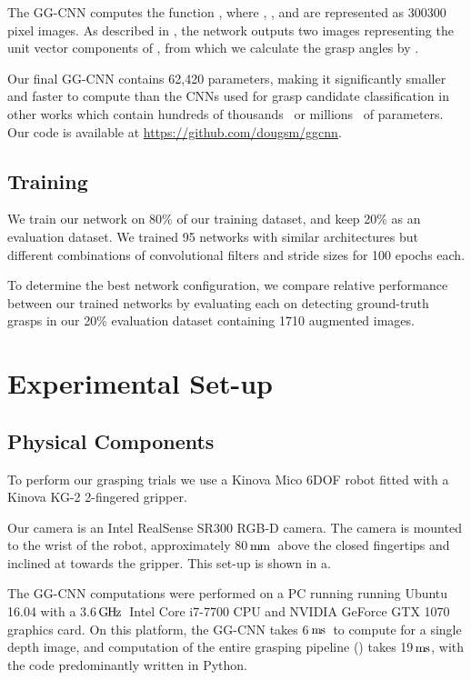\documentclass[conference]{IEEEtran}
\newcommand{\pack}	{\hspace{-0.08em}}
\newcommand{\GHz}	{\ensuremath{\rm\,G\pack H\pack z}}
\newcommand{\mm}	{\ensuremath{\rm\,m\pack m}}
\newcommand{\ms}	{\ensuremath{\rm\,m\pack s}}
\begin{document}
The GG-CNN computes the function , where , ,  and  are represented as 300300 pixel images.  As described in , the network outputs two images representing the unit vector components of , from which we calculate the grasp angles by .

Our final GG-CNN contains 62,420 parameters, making it significantly smaller and faster to compute than the CNNs used for grasp candidate classification in other works which contain hundreds of thousands~\cite{he2016deep, Levine2017LearningCollection} or millions~\cite{Johns2016DeepUncertainty, Mahler2017Dex2, Pinto2016SupersizingHours, Redmon2015Real-timeNetworks} of parameters.  Our code is available at \href{https://github.com/dougsm/ggcnn}{https://github.com/dougsm/ggcnn}.

\subsection{Training}

We train our network on 80\% of our training dataset, and keep 20\% as an evaluation dataset.  We trained 95 networks with similar architectures but different combinations of convolutional filters and stride sizes for 100 epochs each.  


To determine the best network configuration, we compare relative performance between our trained networks by evaluating each on detecting ground-truth grasps in our 20\% evaluation dataset containing 1710 augmented images.  

\section{Experimental Set-up}

\subsection{Physical Components}

To perform our grasping trials we use a Kinova Mico 6DOF robot fitted with a Kinova KG-2 2-fingered gripper.

Our camera is an Intel RealSense SR300 RGB-D camera.  The camera is mounted to the wrist of the robot, approximately 80\mm~above the closed fingertips and inclined at  towards the gripper.  This set-up is shown in a.

The GG-CNN computations were performed on a PC running running Ubuntu 16.04 with a 3.6\GHz~Intel Core i7-7700 CPU and NVIDIA GeForce GTX 1070 graphics card.  On this platform, the GG-CNN takes 6\ms~to compute for a single depth image, and computation of the entire grasping pipeline () takes 19\ms, with the code predominantly written in Python.
\end{document}
